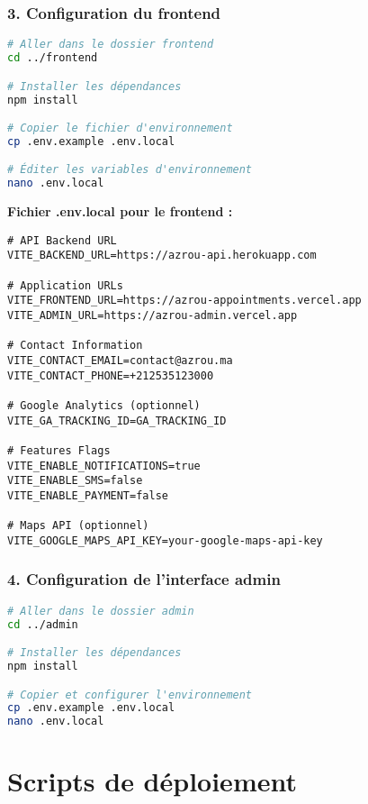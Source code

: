 \subsubsection{3. Configuration du frontend}

\begin{lstlisting}[language=bash, caption=Installation et configuration frontend]
# Aller dans le dossier frontend
cd ../frontend

# Installer les dépendances
npm install

# Copier le fichier d'environnement
cp .env.example .env.local

# Éditer les variables d'environnement
nano .env.local
\end{lstlisting}

\textbf{Fichier .env.local pour le frontend :}

\begin{lstlisting}[caption=Configuration frontend .env.local]
# API Backend URL
VITE_BACKEND_URL=https://azrou-api.herokuapp.com

# Application URLs
VITE_FRONTEND_URL=https://azrou-appointments.vercel.app
VITE_ADMIN_URL=https://azrou-admin.vercel.app

# Contact Information
VITE_CONTACT_EMAIL=contact@azrou.ma
VITE_CONTACT_PHONE=+212535123000

# Google Analytics (optionnel)
VITE_GA_TRACKING_ID=GA_TRACKING_ID

# Features Flags
VITE_ENABLE_NOTIFICATIONS=true
VITE_ENABLE_SMS=false
VITE_ENABLE_PAYMENT=false

# Maps API (optionnel)
VITE_GOOGLE_MAPS_API_KEY=your-google-maps-api-key
\end{lstlisting}

\subsubsection{4. Configuration de l'interface admin}

\begin{lstlisting}[language=bash, caption=Installation et configuration admin]
# Aller dans le dossier admin
cd ../admin

# Installer les dépendances
npm install

# Copier et configurer l'environnement
cp .env.example .env.local
nano .env.local
\end{lstlisting}

\section{Scripts de déploiement}

